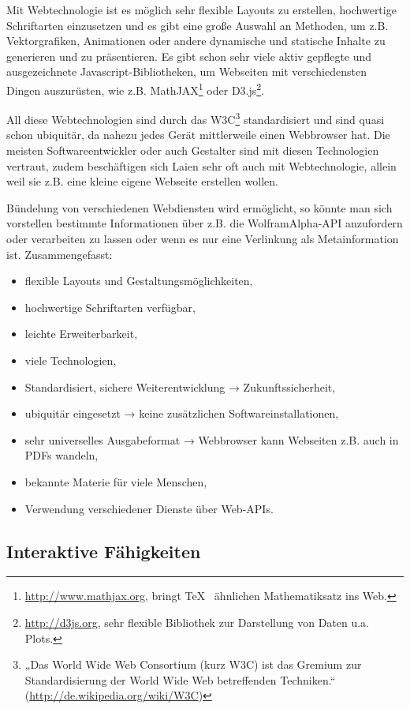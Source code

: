 Mit Webtechnologie ist es möglich sehr flexible Layouts zu erstellen,
hochwertige Schriftarten einzusetzen und es gibt eine große Auswahl an
Methoden, um z.B. Vektorgrafiken, Animationen oder
andere dynamische und statische Inhalte zu generieren und zu
präsentieren. Es gibt schon sehr viele aktiv gepflegte und ausgezeichnete
Javascript-Bibliotheken,
um Webseiten mit verschiedensten Dingen auszurüsten,
wie z.B. MathJAX\footnote{\url{http://www.mathjax.org}, bringt \TeX~ ähnlichen
Mathematiksatz ins Web.} oder
D3.js\footnote{\url{http://d3js.org}, sehr flexible Bibliothek zur Darstellung
von Daten u.a. Plots.}.

All diese Webtechnologien sind durch das W3C\footnote{
„Das World Wide Web Consortium (kurz W3C) ist das Gremium zur
Standardisierung der World Wide Web betreffenden Techniken.“
(\url{http://de.wikipedia.org/wiki/W3C})} standardisiert
und sind quasi schon ubiquitär, da nahezu jedes Gerät mittlerweile einen
Webbrowser hat. Die meisten Softwareentwickler oder auch
Gestalter sind mit diesen Technologien vertraut, zudem beschäftigen sich
Laien sehr oft auch mit Webtechnologie, allein weil sie z.B. eine kleine
eigene Webseite erstellen wollen.

Bündelung von verschiedenen Webdiensten wird ermöglicht, so könnte man sich
vorstellen bestimmte Informationen über z.B. die WolframAlpha-API
anzufordern oder verarbeiten zu lassen oder wenn es nur eine Verlinkung
als Metainformation ist. Zusammengefasst:

\begin{itemize}
  \item flexible Layouts und Gestaltungsmöglichkeiten,
  \item hochwertige Schriftarten verfügbar,
  \item leichte Erweiterbarkeit,
  \item viele Technologien,
  \item Standardisiert, sichere Weiterentwicklung → Zukunftssicherheit,
  \item ubiquitär eingesetzt → keine zusätzlichen Softwareinstallationen,
  \item sehr universelles Ausgabeformat → Webbrowser
        kann Webseiten z.B. auch in PDFs wandeln,
  \item bekannte Materie für viele Menschen,
  \item Verwendung verschiedener Dienste über Web-APIs.
\end{itemize}

\subsection{Interaktive Fähigkeiten}

